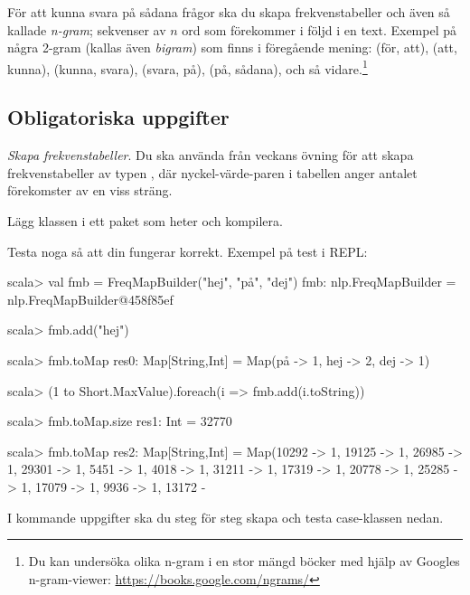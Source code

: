 \noindent För att kunna svara på sådana frågor ska du skapa frekvenstabeller och även så kallade \emph{n-gram}; sekvenser av $n$ ord som förekommer i följd i en text. Exempel på några 2-gram (kallas även \emph{bigram}) som finns i föregående mening: (för, att), (att, kunna), (kunna, svara), (svara, på), (på, sådana), och så vidare.\footnote{Du kan undersöka olika n-gram i en stor mängd böcker med hjälp av Googles n-gram-viewer: \url{https://books.google.com/ngrams/}}

\subsection{Obligatoriska uppgifter}


\Task \emph{Skapa frekvenstabeller}. Du ska använda  från veckans övning för att skapa frekvenstabeller av typen , där nyckel-värde-paren i tabellen anger antalet förekomster av en viss sträng.

\Subtask Lägg klassen  i ett paket som heter  och kompilera.

\begin{figure}[H]
\end{figure}

\Subtask Testa noga så att din  fungerar korrekt. Exempel på test i REPL:
\begin{REPL}
scala> val fmb = FreqMapBuilder("hej", "på", "dej")
fmb: nlp.FreqMapBuilder = nlp.FreqMapBuilder@458f85ef

scala> fmb.add("hej")

scala> fmb.toMap
res0: Map[String,Int] = Map(på -> 1, hej -> 2, dej -> 1)

scala> (1 to Short.MaxValue).foreach(i => fmb.add(i.toString))

scala> fmb.toMap.size
res1: Int = 32770

scala> fmb.toMap
res2: Map[String,Int] = Map(10292 -> 1, 19125 -> 1, 26985 -> 1, 29301 -> 1, 5451 -> 1, 4018 -> 1, 31211 -> 1, 17319 -> 1, 20778 -> 1, 25285 -> 1, 17079 -> 1, 9936 -> 1, 13172 -
\end{REPL}

\noindent I kommande uppgifter ska du steg för steg skapa och testa case-klassen  nedan. %


